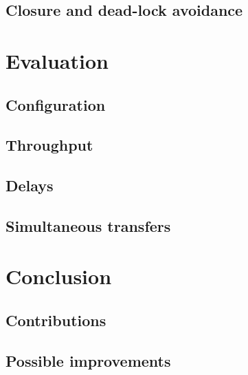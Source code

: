 \documentclass[journal]{IEEEtran}
\begin{document}
\subsection{Closure and dead-lock avoidance}






\section{Evaluation}


\subsection{Configuration}

\subsection{Throughput}





\subsection{Delays}

\subsection{Simultaneous transfers}






\section{Conclusion}

\subsection{Contributions}


\subsection{Possible improvements}







 
\end{document}

